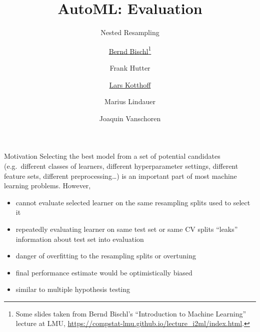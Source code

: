




\title[AutoML: Risks]{AutoML: Evaluation} %
\subtitle{Nested Resampling} %
\author[Lars Kotthoff]{\underline{Bernd Bischl}\footnote{Some slides taken from Bernd Bischl's ``Introduction to Machine Learning'' lecture at LMU, \url{https://compstat-lmu.github.io/lecture_i2ml/index.html}.} \and Frank Hutter \and \underline{Lars Kotthoff}\newline \and Marius Lindauer \and Joaquin Vanschoren}
\institute{}
\date{}

\newcommand\reffootnote[1]{%
    \begingroup
    \renewcommand\thefootnote{}\footnote{
        \tiny #1
    \vspace*{1em}}%
    \addtocounter{footnote}{-1}%
    \endgroup
}



	
	\maketitle

    \begin{frame}[c]{Motivation}
    Selecting the best model from a set of potential candidates (e.g.\ different
    classes of learners, different hyperparameter settings, different feature
    sets, different preprocessing\ldots) is an important part of most  machine
    learning problems. However,

    \begin{itemize}
        \item cannot evaluate selected learner on the same
            resampling splits used to select it
        \item repeatedly evaluating learner on same test set or same CV splits
            ``leaks'' information about test set into evaluation
        \item danger of overfitting to the resampling splits or overtuning
        \item final performance estimate would be optimistically biased
        \item similar to multiple hypothesis testing
    \end{itemize}
    \end{frame}

